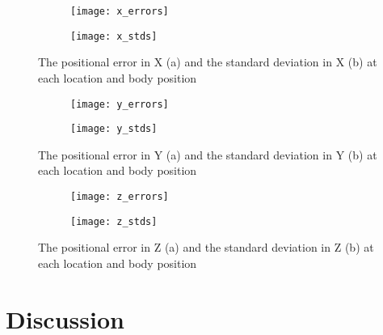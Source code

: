 \begin{figure}[ht]
    \centering
    \begin{subfigure}[b]{\textwidth}
        \centering
        \texttt{[image: x\_errors]}
        \caption{}
    \end{subfigure}
    \begin{subfigure}[b]{\textwidth}
        \centering
        \texttt{[image: x\_stds]}
        \caption{}
    \end{subfigure}
    \caption{The positional error in X (a) and the standard deviation in X (b) at each location
    and body position
    }
    \label{fig:xposstats}
\end{figure}

\begin{figure}[ht]
    \centering
    \begin{subfigure}[b]{\textwidth}
        \centering
        \texttt{[image: y\_errors]}
        \caption{}
    \end{subfigure}
    \begin{subfigure}[b]{\textwidth}
        \centering
        \texttt{[image: y\_stds]}
        \caption{}
    \end{subfigure}
    \caption{The positional error in Y (a) and the standard deviation in Y (b) at each location
    and body position}
    \label{fig:yposstats}
\end{figure}

\begin{figure}[ht]
    \centering
    \begin{subfigure}[b]{\textwidth}
        \centering
        \texttt{[image: z\_errors]}
        \caption{}
    \end{subfigure}
    \begin{subfigure}[b]{\textwidth}
        \centering
        \texttt{[image: z\_stds]}
        \caption{}
    \end{subfigure}
    \caption{The positional error in Z (a) and the standard deviation in Z (b) at each location
    and body position}
    \label{fig:zposstats}
\end{figure}

\clearpage
\section{Discussion}

